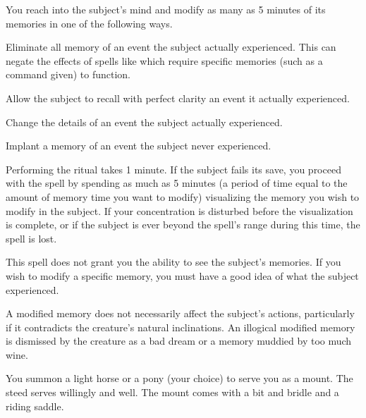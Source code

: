 \spellrng{\rngclose}
\begin{spelleffect}
  You reach into the subject's mind and modify as many as 5 minutes of its memories in one of the following ways.
  \begin{itemize*}
      \item Eliminate all memory of an event the subject actually experienced. This can negate the effects of spells like  which require specific memories (such as a command given) to function.
    \item Allow the subject to recall with perfect clarity an event it actually experienced.
    \item Change the details of an event the subject actually experienced.
    \item Implant a memory of an event the subject never experienced.
  \end{itemize*}
  \par Performing the ritual takes 1 minute. If the subject fails its save, you proceed with the spell by spending as much as 5 minutes (a period of time equal to the amount of memory time you want to modify) visualizing the memory you wish to modify in the subject. If your concentration is disturbed before the visualization is complete, or if the subject is ever beyond the spell's range during this time, the spell is lost.
  \par This spell does not grant you the ability to see the subject's memories. If you wish to modify a specific memory, you must have a good idea of what the subject experienced.
\end{spelleffect}
\begin{spellnotes}
  A modified memory does not necessarily affect the subject's actions, particularly if it contradicts the creature's natural inclinations. An illogical modified memory is dismissed by the creature as a bad dream or a memory muddied by too much wine.
\end{spellnotes}

\spellrng{\rngclose}
\begin{spelleffect}
You summon a light horse or a pony (your choice) to serve you as a mount. The steed serves willingly and well. The mount comes with a bit and bridle and a riding saddle.
\end{spelleffect}

